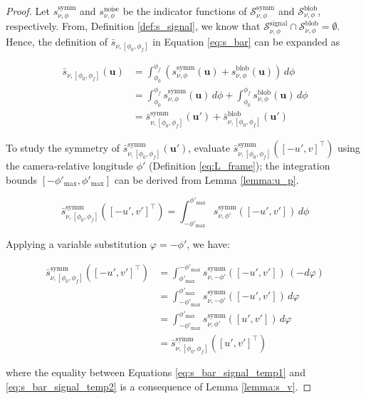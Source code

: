 \begin{proof}
    Let $s^{\mathrm{symm}}_{\nu,\phi}$ and $s^{\mathrm{noise}}_{\nu,\phi}$ be the indicator functions of $\mathcal{S}^\mathrm{symm}_{\nu,\phi}$ and $\mathcal{S}^\mathrm{blob}_{\nu,\phi}$, respectively. From, Definition \ref{def:s_signal}, we know that $\mathcal{S}^\mathrm{signal}_{\nu,\phi} \cap \mathcal{S}^\mathrm{blob}_{\nu,\phi} = \emptyset$. Hence, the definition of $\bar{s}_{\nu,[\phi_0,\phi_f]}$ in Equation \ref{eq:s_bar} can be expanded as

    \begin{align}
        \bar{s}_{\nu,[\phi_0,\phi_f]}(\mathbf{u}) &= \int_{\phi_0}^{\phi_f} \left( s^{\mathrm{symm}}_{\nu,\phi}(\mathbf{u}) + s^{\mathrm{blob}}_{\nu,\phi}(\mathbf{u}) \right)\, d\phi \\
        &= \int_{\phi_0}^{\phi_f} s^{\mathrm{symm}}_{\nu,\phi}(\mathbf{u})\, d\phi + \int_{\phi_0}^{\phi_f} s^{\mathrm{blob}}_{\nu,\phi}(\mathbf{u}) \, d\phi \\
        &= \bar{s}^{\mathrm{symm}}_{\nu,[\phi_0,\phi_f]}(\mathbf{u}') + \bar{s}^{\mathrm{blob}}_{\nu,[\phi_0,\phi_f]}(\mathbf{u}')
    \end{align}
    
    To study the symmetry of $\bar{s}^{\mathrm{symm}}_{\nu,[\phi_0,\phi_f]}(\mathbf{u}')$, evaluate $\bar{s}^{\mathrm{symm}}_{\nu,[\phi_0,\phi_f]}([-u',v]^\top)$ using the camera-relative longitude $\phi'$ (Definition \ref{eq:L_frame}); the integration bounds $[-\phi'_\mathrm{max},\phi'_\mathrm{max}]$ can be derived from Lemma \ref{lemma:u_p}.

    \begin{equation}
        \bar{s}^{\mathrm{symm}}_{\nu,[\phi_0,\phi_f]}([-u',v']^\top) = \int_{-\phi'_\mathrm{max}}^{\phi'_\mathrm{max}} s^{\mathrm{symm}}_{\nu,\phi'}([-u',v'])\, d\phi
    \end{equation}

Applying a variable substitution $\varphi=-\phi'$, we have:

\begin{align}
    \bar{s}^{\mathrm{symm}}_{\nu,[\phi_0,\phi_f]}([-u',v']^\top) &= \int_{\phi'_\mathrm{max}}^{-\phi'_\mathrm{max}} s^{\mathrm{symm}}_{\nu,-\phi'}([-u',v'])\, (-d\varphi) \\
    &= \int_{-\phi'_\mathrm{max}}^{\phi'_\mathrm{max}} s^{\mathrm{symm}}_{\nu,-\phi'}([-u',v'])\, d\varphi \label{eq:s_bar_signal_temp1}\\
    &= \int_{-\phi'_\mathrm{max}}^{\phi'_\mathrm{max}} s^{\mathrm{symm}}_{\nu,\phi'}([u',v'])\, d\varphi \label{eq:s_bar_signal_temp2}\\
    &= \bar{s}^{\mathrm{symm}}_{\nu,[\phi_0,\phi_f]}([u',v']^\top)
\end{align}

where the equality between Equations \ref{eq:s_bar_signal_temp1} and \ref{eq:s_bar_signal_temp2} is a consequence of Lemma \ref{lemma:s_v}.
\end{proof}

